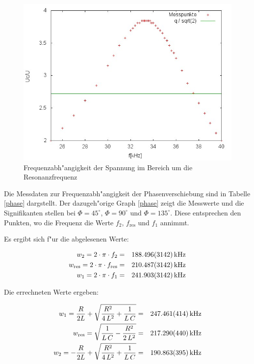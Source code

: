 	\begin{figure}[htbp]
		\centering
		\includegraphics[width = 12cm]{img/graph_c_1.jpg}
		\caption{Frequenzabh"angigkeit der Spannung im Bereich um die Resonanzfrequenz}
		\label{frequenz_2}
	\end{figure}

	Die Messdaten zur Frequenzabh"angigkeit der Phasenverschiebung sind in Tabelle \eqref{phase} dargstellt.
	Der dazugeh"orige Graph \eqref{phase} zeigt die Messwerte und die Signifikanten stellen bei $\Phi = 45^\circ$, $\Phi = 90^\circ$ und $\Phi = 135^\circ$.
	Diese entsprechen den Punkten, wo die Frequenz die Werte $f_2$, $f_\mathrm{res}$ und $f_1$ annimmt.

	Es ergibt sich f"ur die abgelesenen Werte:

	\begin{eqnarray*}
		w_2 = 2 \cdot \pi \cdot f_2 &=& \SI{188.496 (3142)}{\kilo \hertz}\\
		w_\mathrm{res} = 2 \cdot \pi \cdot f_\mathrm{res} &=& \SI{210.487 (3142)}{\kilo \hertz}\\
		w_1 = 2 \cdot \pi \cdot f_1 &=& \SI{241.903 (3142)}{\kilo \hertz}
	\end{eqnarray*}

	Die errechneten Werte ergeben:

	\begin{eqnarray*}
		w_1 = \frac{R}{2L} + \sqrt{\frac{R^2}{4\,L^2} + \frac{1}{L \, C}} &=& \SI{247.461 (414)}{\kilo \hertz}\\
		w_\mathrm{res} = \sqrt{\frac{1}{L\, C} - \frac{R^2}{2 \, L^2}} &=& \SI{217.290 (440)}{\kilo \hertz}\\
		w_2 = -\frac{R}{2L} + \sqrt{\frac{R^2}{4\,L^2} + \frac{1}{L \, C}} &=& \SI{190.863 (395)}{\kilo \hertz}
	\end{eqnarray*}

